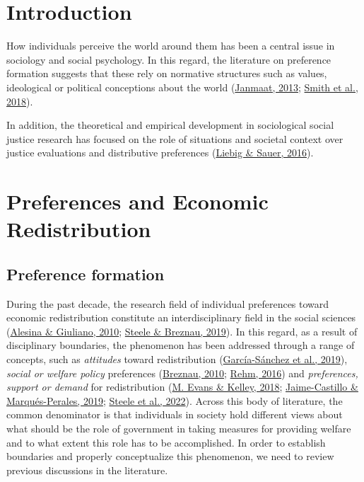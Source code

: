 \documentclass[
  12pt,
]{book}
\begin{document}
\hypertarget{introduction}{%
\chapter{Introduction}\label{introduction}}

How individuals perceive the world around them has been a central issue in sociology and social psychology. In this regard, the literature on preference formation suggests that these rely on normative structures such as values, ideological or political conceptions about the world (\protect\hyperlink{ref-Janmaat2013}{Janmaat, 2013}; \protect\hyperlink{ref-smithCulturalValuesModerate2018}{Smith et al., 2018}).

In addition, the theoretical and empirical development in sociological social justice research has focused on the role of situations and societal context over justice evaluations and distributive preferences (\protect\hyperlink{ref-Liebig-Sauer2016}{Liebig \& Sauer, 2016}).

\hypertarget{preferences-and-economic-redistribution}{%
\chapter{Preferences and Economic Redistribution}\label{preferences-and-economic-redistribution}}

\hypertarget{preference-formation}{%
\section{Preference formation}\label{preference-formation}}

During the past decade, the research field of individual preferences toward economic redistribution constitute an interdisciplinary field in the social sciences (\protect\hyperlink{ref-alesina_preferences_2010}{Alesina \& Giuliano, 2010}; \protect\hyperlink{ref-steele_attitudes_2019}{Steele \& Breznau, 2019}). In this regard, as a result of disciplinary boundaries, the phenomenon has been addressed through a range of concepts, such as \emph{attitudes} toward redistribution (\protect\hyperlink{ref-Garcia-Sanchez19}{García-Sánchez et al., 2019}), \emph{social or welfare policy} preferences (\protect\hyperlink{ref-breznau_economic_2010}{Breznau, 2010}; \protect\hyperlink{ref-rehm_risk_2016}{Rehm, 2016}) and \emph{preferences, support or demand} for redistribution (\protect\hyperlink{ref-evans_strong_2018}{M. Evans \& Kelley, 2018}; \protect\hyperlink{ref-jaime-castillo_social_2019}{Jaime-Castillo \& Marqués-Perales, 2019}; \protect\hyperlink{ref-steele_wealth_2022}{Steele et al., 2022}). Across this body of literature, the common denominator is that individuals in society hold different views about what should be the role of government in taking measures for providing welfare and to what extent this role has to be accomplished. In order to establish boundaries and properly conceptualize this phenomenon, we need to review previous discussions in the literature.
\end{document}
